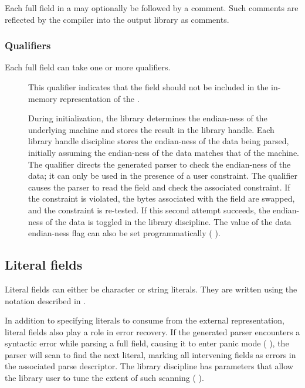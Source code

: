 Each full field in a \Pstruct{} may optionally be followed by a \PADSL{}
comment. Such comments are reflected by the \PADS{} compiler into the
output library as comments. 

\subsubsection{Qualifiers}
\label{sec:structs-qualifiers}
Each full field can take one or more qualifiers.
\begin{description}
\item[\Pomit{}] This qualifier indicates that the field
  should not be included in the in-memory representation of the
  \Pstruct{}. 
\item[\Pendian{}] During initialization, the \PADS{} library
  determines the endian-ness of the underlying machine and stores the
  result in the library handle.  Each library handle discipline stores
  the endian-ness of the data being parsed, initially assuming the
  endian-ness of the data matches that of the machine.  The \Pendian{}
  qualifier directs the generated parser to check the endian-ness of
  the data; it can only be used in the presence of a user constraint.
  The qualifier causes the parser to read the field and check the
  associated constraint.  If the constraint is violated, the bytes
  associated with the field are swapped, and the constraint is
  re-tested.  If this second attempt succeeds, the endian-ness of the
  data is toggled in the library discipline.  The value of the data
  endian-ness flag can also be set programmatically (\cf
  ).
\end{description}

\subsection{Literal fields}
\label{sec:structs-literal-fields}
Literal fields can either be character or string literals.  They are
written using the notation described in .  

In addition to specifying literals to consume from the external
representation, literal fields also play a role in error recovery.  If
the generated parser encounters a syntactic error while parsing a full
field, causing it to enter panic mode (\cf{}
), the parser will scan to find the next
literal, marking all intervening fields as errors in the
associated parse descriptor.  The library discipline has parameters
that allow the library user to tune the extent of such scanning
(\cf{} ).

